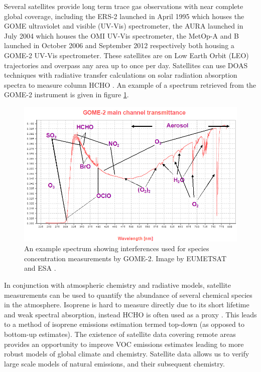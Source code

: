       Several satellites provide long term trace gas observations with near complete global coverage, including the ERS-2 launched in April 1995 which houses the GOME ultraviolet and visible (UV-Vis) spectrometer, the AURA launched in July 2004 which houses the OMI UV-Vis spectrometer, the MetOp-A and B launched in October 2006 and September 2012 respectively both housing a GOME-2 UV-Vis spectrometer.
      These satellites are on Low Earth Orbit (LEO) trajectories and overpass any area up to once per day.
      Satellites can use DOAS techniques with radiative transfer calculations on solar radiation absorption spectra to measure column HCHO .
      An example of a spectrum retrieved from the GOME-2 instrument is given in figure \ref{LR:HCHO:Sat:fig_GOME_products}.
      
      \begin{figure}
        \includegraphics[width=\textwidth]{Figures/GOME_SPECTRUM.jpg}
        \caption{%
          An example spectrum showing interferences used for species concentration measurements by GOME-2. Image by EUMETSAT and ESA \parencite{GOME2Image}.
          }
        \label{LR:HCHO:Sat:fig_GOME_products}
      \end{figure}
      
      In conjunction with atmospheric chemistry and radiative models, satellite measurements can be used to quantify the abundance of several chemical species in the atmosphere.
      Isoprene is hard to measure directly due to its short lifetime and weak spectral absorption, instead HCHO is often used as a proxy \parencite{Millet2006, Fu2007, Dufour2009, Marais2012, bauwens2013satellite, Kefauver2014, Bauwens2016, Surl2018}.
      This leads to a method of isoprene emissions estimation termed top-down (as opposed to bottom-up estimates).
      The existence of satellite data covering remote areas provides an opportunity to improve VOC emissions estimates leading to more robust models of global climate and chemistry. 
      Satellite data allows us to verify large scale models of natural emissions, and their subsequent chemistry.
  

